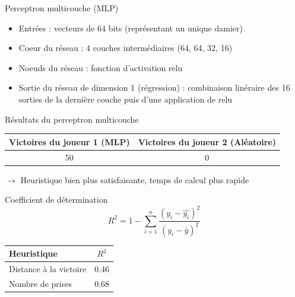 \documentclass{beamer}
\begin{document}
\begin{frame}{Perceptron multicouche (MLP)}
    \begin{itemize}
        \item Entrées : vecteurs de 64 bits (représentant un unique damier)
        \item Coeur du réseau : 4 couches intermédiaires (64, 64, 32, 16)
        \item Noeuds du réseau : fonction d'activation \alert{relu}
        \item Sortie du réseau de dimension 1 (régression) : combinaison linéraire des 16 sorties de la dernière couche puis d'une application de \alert{relu}
    \end{itemize}
\end{frame}

\begin{frame}{Résultats du perceptron multicouche}
    \begin{center}
        \begin{tabular}{ | c | c | }
            \hline
            Victoires du joueur 1 (MLP) & Victoires du joueur 2 (Aléatoire) \\ \hline
            50                          & 0                                 \\ \hline
        \end{tabular}
    \end{center}
    $\rightarrow$ Heuristique bien plus satisfaisante, temps de calcul plus rapide
\end{frame}

\begin{frame}{Coefficient de détermination}
    $$R^2 = 1 - \sum_{i=1}^{n} \frac{(y_i - \hat{y_i})^2}{(y_i - \bar{y})^2}$$
    \begin{center}
        \begin{tabular}{ | l | c | }
            \hline
            Heuristique            & $R^2$ \\ \hline
            Distance à la victoire & 0.46  \\ \hline
            Nombre de prises       & 0.68  \\ \hline
        \end{tabular}
    \end{center}
\end{frame}
\end{document}
